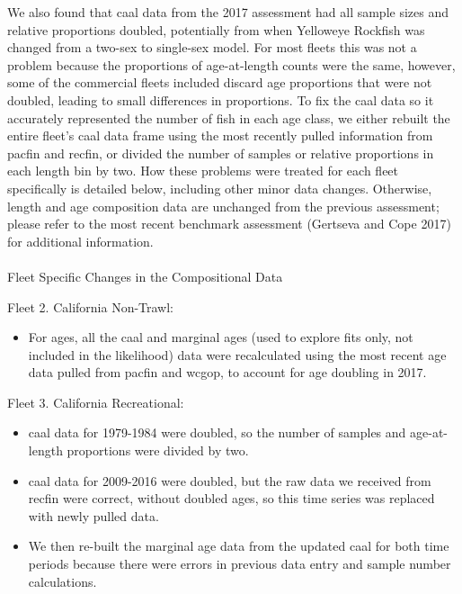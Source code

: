 \documentclass[
]{scrartcl}
\makeatletter
\let\oldparagraph\paragraph
\renewcommand{\paragraph}{
    \@ifstar
      \xxxParagraphStar
      \xxxParagraphNoStar
  }
\newcommand{\xxxParagraphStar}[1]{\oldparagraph*{#1}\mbox{}}
\newcommand{\xxxParagraphNoStar}[1]{\oldparagraph{#1}\mbox{}}
\providecommand{\tightlist}{%
  \setlength{\itemsep}{0pt}\setlength{\parskip}{0pt}}\usepackage{longtable,booktabs,array}
\makeatother
\begin{document}
We also found that \gls{caal} data from the 2017 assessment had all
sample sizes and relative proportions doubled, potentially from when
Yelloweye Rockfish was changed from a two-sex to single-sex model. For
most fleets this was not a problem because the proportions of
age-at-length counts were the same, however, some of the commercial
fleets included discard age proportions that were not doubled, leading
to small differences in proportions. To fix the \gls{caal} data so it
accurately represented the number of fish in each age class, we either
rebuilt the entire fleet's \gls{caal} data frame using the most recently
pulled information from \gls{pacfin} and \gls{recfin}, or divided the
number of samples or relative proportions in each length bin by two. How
these problems were treated for each fleet specifically is detailed
below, including other minor data changes. Otherwise, length and age
composition data are unchanged from the previous assessment; please
refer to the most recent benchmark assessment (Gertseva and Cope 2017)
for additional information.

\paragraph{Fleet Specific Changes in the Compositional
Data}\label{fleet-specific-changes-in-the-compositional-data}

Fleet 2. California Non-Trawl:

\begin{itemize}
\tightlist
\item
  For ages, all the \gls{caal} and marginal ages (used to explore fits
  only, not included in the likelihood) data were recalculated using the
  most recent age data pulled from \gls{pacfin} and \gls{wcgop}, to
  account for age doubling in 2017.
\end{itemize}

Fleet 3. California Recreational:

\begin{itemize}
\tightlist
\item
  \gls{caal} data for 1979-1984 were doubled, so the number of samples
  and age-at-length proportions were divided by two.
\item
  \gls{caal} data for 2009-2016 were doubled, but the raw data we
  received from \gls{recfin} were correct, without doubled ages, so this
  time series was replaced with newly pulled data.
\item
  We then re-built the marginal age data from the updated \gls{caal} for
  both time periods because there were errors in previous data entry and
  sample number calculations.
\end{itemize}
\end{document}
